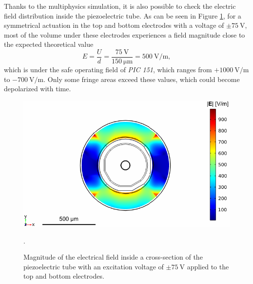 
Thanks to the multiphysics simulation, it is also possible to check the electric field distribution inside the piezoelectric tube. As can be seen in Figure \ref{fig:field}, for a symmetrical actuation in the top and bottom electrodes with a voltage of $\pm \SI{75}{\volt}$, most of the volume under these electrodes experiences a field magnitude close to the expected theoretical value 
\begin{equation}
E= \frac{U}{d}  = \frac{\SI{75}{\volt}}{\SI{150}{\micro\meter}}  = \SI{500}{\volt/\meter},
\end{equation}
which is under the safe operating field of \textit{PIC 151}, which ranges from $ +\SI{1000}{\volt/\meter}$ to $ -\SI{700}{\volt/\meter}$. Only some fringe areas exceed these values, which could become depolarized with time.
\begin{figure}[h!]\centering
      \includegraphics{figures/30_DesignSimulation/Mechanical/field.pdf}
      \caption{Magnitude of the electrical field inside a cross-section of the piezoelectric tube with an excitation voltage of $\pm \SI{75}{\volt}$ applied to the top and bottom electrodes.}.
      \label{fig:field}
\end{figure}
      
      
